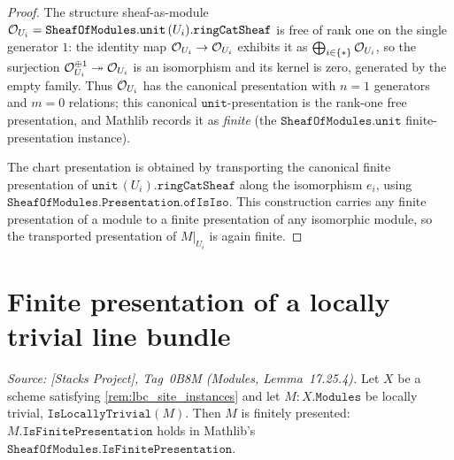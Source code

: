 \begin{proof}
  \leanok
  The structure sheaf-as-module \(\mathcal{O}_{U_i} = \mathtt{SheafOfModules.unit}\,
  (U_i).\mathtt{ringCatSheaf}\) is free of rank one on the single generator
  \(1\): the identity map \(\mathcal{O}_{U_i} \to \mathcal{O}_{U_i}\) exhibits it as
  \(\bigoplus_{i \in \{*\}} \mathcal{O}_{U_i}\), so the surjection
  \(\mathcal{O}_{U_i}^{\oplus 1} \twoheadrightarrow \mathcal{O}_{U_i}\) is an isomorphism
  and its kernel is zero, generated by the empty family. Thus \(\mathcal{O}_{U_i}\)
  has the canonical presentation with \(n = 1\) generators and \(m = 0\)
  relations; this canonical \(\mathtt{unit}\)-presentation is the rank-one free
  presentation, and Mathlib records it as \emph{finite} (the
  \(\mathtt{SheafOfModules.unit}\) finite-presentation instance).

  The chart presentation is obtained by transporting the canonical finite
  presentation of \(\mathtt{unit}\,(U_i).\mathtt{ringCatSheaf}\) along the
  isomorphism \(e_i\), using \(\mathtt{SheafOfModules.Presentation.ofIsIso}\).
  This construction carries any finite presentation of a module to a finite
  presentation of any isomorphic module, so the transported presentation of
  \(M|_{U_i}\) is again finite.
\end{proof}

\section{Finite presentation of a locally trivial line bundle}
\label{sec:lbc_finite_presentation}

\begin{theorem}\leanok
  \label{thm:lbc_isFinitePresentation}
  \textit{Source: [Stacks Project], Tag~0B8M (Modules, Lemma~17.25.4).}
  Let \(X\) be a scheme satisfying \cref{rem:lbc_site_instances} and let
  \(M : X.\mathtt{Modules}\) be locally trivial, \(\texttt{IsLocallyTrivial}(M)\). Then
  \(M\) is finitely presented: \(M.\mathtt{IsFinitePresentation}\) holds in
  Mathlib's \(\mathtt{SheafOfModules.IsFinitePresentation}\).
\end{theorem}

